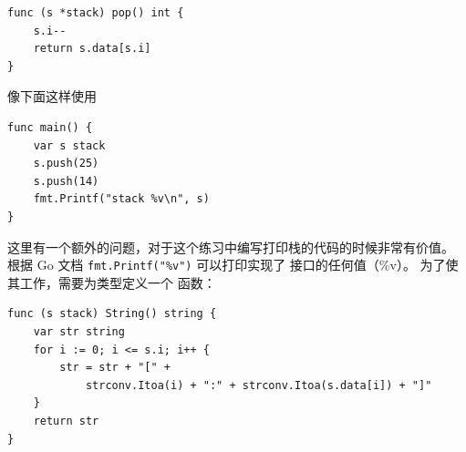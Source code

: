 \begin{Answer}
\begin{lstlisting}
func (s *stack) pop() int {
	s.i--
	return s.data[s.i]
}
\end{lstlisting}
像下面这样使用
\begin{lstlisting}
func main() {
	var s stack
	s.push(25)
	s.push(14)
	fmt.Printf("stack %v\n", s)
}
\end{lstlisting}

\Question 这里有一个额外的问题，对于这个练习中编写打印栈的代码的时候非常有价值。
根据 Go 文档 \lstinline{fmt.Printf("%v")} 可以打印实现了
 接口的任何值（\%v）。
为了使其工作，需要为类型定义一个  函数：
\begin{lstlisting}[caption=stack.String()]
func (s stack) String() string {
	var str string
	for i := 0; i <= s.i; i++ {
		str = str + "[" +
			strconv.Itoa(i) + ":" + strconv.Itoa(s.data[i]) + "]"
	}
	return str
}
\end{lstlisting}
\end{Answer}

